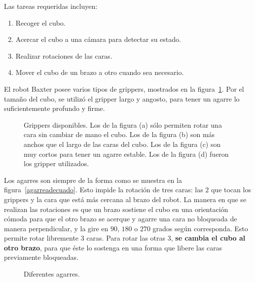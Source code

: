 Las tareas requeridas incluyen:
\begin{enumerate}
	\item Recoger el cubo.
	\item Acercar el cubo a una cámara para detectar su estado.
	\item Realizar rotaciones de las caras.
	\item Mover el cubo de un brazo a otro cuando sea necesario.
\end{enumerate}

El robot Baxter posee varios tipos de grippers, mostrados en la figura~\ref{grippers}. Por el tamaño del cubo, se utilizó el gripper largo y angosto, para tener un agarre lo suficientemente profundo y firme.

\begin{figure}[h!]
	\centering
	\hfill
	\hfill
	\hfill
	\caption[Pinzas disponibles.]{Grippers disponibles. Los de la figura (a) sólo permiten rotar una cara sin cambiar de mano el cubo. Los de la figura (b) son más anchos que el largo de las caras del cubo. Los de la figura (c) son muy cortos para tener un agarre estable. Los de la figura (d) fueron los gripper utilizados.}
	\label{grippers}
\end{figure}

Los agarres son siempre de la forma como se muestra en la figura~\ref{agarreadecuado}. Esto impide la rotación de tres caras: las $2$ que tocan los grippers y la cara que está más cercana al brazo del robot. La manera en que se realizan las rotaciones es que un brazo sostiene el cubo en una orientación cómoda para que el otro brazo se acerque y agarre una cara no bloqueada de manera perpendicular, y la gire en $90$, $180$ o $270$ grados según corresponda. Esto permite rotar libremente $3$ caras. Para rotar las otras $3$, \textbf{se cambia el cubo al otro brazo}, para que éste lo sostenga en una forma que libere las caras previamente bloqueadas.

\begin{figure}[h!]
	\centering
	\hfill
	\hfill
	\hfill
	\caption{Diferentes agarres.}
	\label{agarre}
\end{figure}

